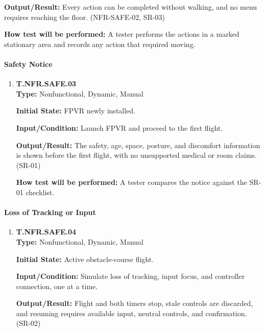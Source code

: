 \documentclass[12pt, titlepage]{article}
\begin{document}
{\begin{enumerate}
\textbf{Output/Result:} Every action can be completed without walking, and no menu
requires reaching the floor. (\mbox{NFR-SAFE-02}, \mbox{SR-03})

\textbf{How test will be performed:} A tester performs the actions in a marked
stationary area and records any action that required moving.

\end{enumerate}

\paragraph{Safety Notice}

\begin{enumerate}

\item{\hypertarget{test-nfr-safe-03}{}\textbf{T.NFR.SAFE.03}\\}
\textbf{Type:} Nonfunctional, Dynamic, Manual

\textbf{Initial State:} FPVR newly installed.

\textbf{Input/Condition:} Launch FPVR and proceed to the first flight.

\textbf{Output/Result:} The safety, age, space, posture, and discomfort information is
shown before the first flight, with no unsupported medical or room claims.
(\mbox{SR-01})

\textbf{How test will be performed:} A tester compares the notice against the
\mbox{SR-01} checklist.

\end{enumerate}

\paragraph{Loss of Tracking or Input}

\begin{enumerate}

\item{\hypertarget{test-nfr-safe-04}{}\textbf{T.NFR.SAFE.04}\\}
\textbf{Type:} Nonfunctional, Dynamic, Manual

\textbf{Initial State:} Active obstacle-course flight.

\textbf{Input/Condition:} Simulate loss of tracking, input focus, and controller
connection, one at a time.

\textbf{Output/Result:} Flight and both timers stop, stale controls are discarded, and
resuming requires available input, neutral controls, and confirmation. (\mbox{SR-02})


\end{enumerate}}
\end{document}

